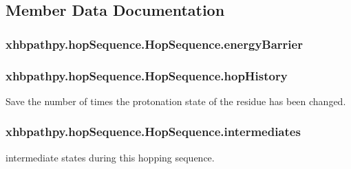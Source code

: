 \subsection{Member Data Documentation}
\hypertarget{classxhbpathpy_1_1hop_sequence_1_1_hop_sequence_af3998fce6d2d3ee13d7767730c7f9991}{
\subsubsection[{energy\-Barrier}]{\setlength{\rightskip}{0pt plus 5cm}xhbpathpy.\-hop\-Sequence.\-Hop\-Sequence.\-energy\-Barrier}}\label{classxhbpathpy_1_1hop_sequence_1_1_hop_sequence_af3998fce6d2d3ee13d7767730c7f9991}
\hypertarget{classxhbpathpy_1_1hop_sequence_1_1_hop_sequence_a5b261819492711ec0ef1e15f433ba400}{
\subsubsection[{hop\-History}]{\setlength{\rightskip}{0pt plus 5cm}xhbpathpy.\-hop\-Sequence.\-Hop\-Sequence.\-hop\-History}}\label{classxhbpathpy_1_1hop_sequence_1_1_hop_sequence_a5b261819492711ec0ef1e15f433ba400}


Save the number of times the protonation state of the residue has been changed. 

\hypertarget{classxhbpathpy_1_1hop_sequence_1_1_hop_sequence_a45461fb5db5f5b061b07a75ebab4fa57}{
\subsubsection[{intermediates}]{\setlength{\rightskip}{0pt plus 5cm}xhbpathpy.\-hop\-Sequence.\-Hop\-Sequence.\-intermediates}}\label{classxhbpathpy_1_1hop_sequence_1_1_hop_sequence_a45461fb5db5f5b061b07a75ebab4fa57}


intermediate states during this hopping sequence. 

